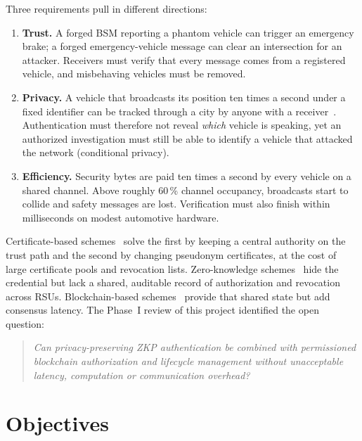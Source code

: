 Three requirements pull in different directions:
\begin{enumerate}
  \item \textbf{Trust.} A forged BSM reporting a phantom vehicle can trigger an emergency brake; a
  forged emergency-vehicle message can clear an intersection for an attacker. Receivers must verify
  that every message comes from a registered vehicle, and misbehaving vehicles must be removed.
  \item \textbf{Privacy.} A vehicle that broadcasts its position ten times a second under a fixed
  identifier can be tracked through a city by anyone with a receiver~\cite{gruteser2005tracking}.
  Authentication must therefore not reveal \emph{which} vehicle is speaking, yet an authorized
  investigation must still be able to identify a vehicle that attacked the network (conditional
  privacy).
  \item \textbf{Efficiency.} Security bytes are paid ten times a second by every vehicle on a shared
  channel. Above roughly 60\,\% channel occupancy, broadcasts start to collide and safety messages
  are lost. Verification must also finish within milliseconds on modest automotive hardware.
\end{enumerate}
Certificate-based schemes~\cite{raya2007securing,brecht2018scms} solve the first by keeping a
central authority on the trust path and the second by changing pseudonym certificates, at the cost of
large certificate pools and revocation lists. Zero-knowledge schemes~\cite{rasheed2020adaptive,xi2022zama}
hide the credential but lack a shared, auditable record of authorization and revocation across RSUs.
Blockchain-based schemes~\cite{alsaeed2025baaiov,li2024bpa,wang2021btsca} provide that shared state
but add consensus latency. The Phase~I review of this project identified the open question:

\begin{quote}
\emph{Can privacy-preserving ZKP authentication be combined with permissioned blockchain
authorization and lifecycle management without unacceptable latency, computation or communication
overhead?}
\end{quote}

\section{Objectives}

